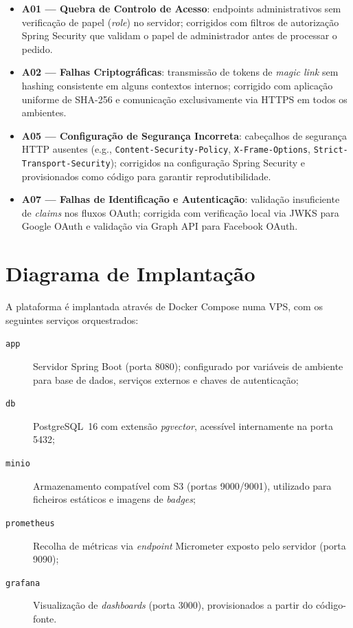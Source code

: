 \begin{itemize}
  \item \textbf{A01 --- Quebra de Controlo de Acesso}: endpoints administrativos sem verificação de papel (\textit{role}) no servidor; corrigidos com filtros de autorização Spring Security que validam o papel de administrador antes de processar o pedido.

  \item \textbf{A02 --- Falhas Criptográficas}: transmissão de tokens de \textit{magic link} sem hashing consistente em alguns contextos internos; corrigido com aplicação uniforme de SHA-256 e comunicação exclusivamente via HTTPS em todos os ambientes.

  \item \textbf{A05 --- Configuração de Segurança Incorreta}: cabeçalhos de segurança HTTP ausentes (e.g., \texttt{Content-Security-Policy}, \texttt{X-Frame-Options}, \texttt{Strict-Transport-Security}); corrigidos na configuração Spring Security e provisionados como código para garantir reprodutibilidade.

  \item \textbf{A07 --- Falhas de Identificação e Autenticação}: validação insuficiente de \textit{claims} nos fluxos OAuth; corrigida com verificação local via JWKS para Google OAuth e validação via Graph API para Facebook OAuth.
\end{itemize}

\section{Diagrama de Implantação}
\label{sec:diagrama_implantacao}

A plataforma é implantada através de Docker Compose numa VPS, com os seguintes serviços orquestrados:

\begin{description}
  \item[\texttt{app}] Servidor Spring Boot (porta 8080); configurado por variáveis de ambiente para base de dados, serviços externos e chaves de autenticação;
  \item[\texttt{db}] PostgreSQL~16 com extensão \textit{pgvector}, acessível internamente na porta 5432;
  \item[\texttt{minio}] Armazenamento compatível com S3 (portas 9000/9001), utilizado para ficheiros estáticos e imagens de \textit{badges};
  \item[\texttt{prometheus}] Recolha de métricas via \textit{endpoint} Micrometer exposto pelo servidor (porta 9090);
  \item[\texttt{grafana}] Visualização de \textit{dashboards} (porta 3000), provisionados a partir do código-fonte.
\end{description}

